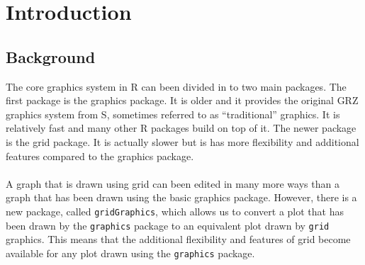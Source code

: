 \documentclass[a4paper,10pt]{article}
\begin{document}


\section{Introduction}
\subsection{Background}
The core graphics system in R can been divided in to two main packages. The first package is the graphics package. It is older and it provides the original GRZ graphics system from S, sometimes referred to as ``traditional'' graphics. It is relatively fast and many other R packages build on top of it. The newer package is the grid package. It is actually slower but is has more flexibility and additional features compared to the graphics package. \\\\
A graph that is drawn using grid can been edited in many more ways than a graph that has been drawn using the basic graphics package. However, there is a new package, called \texttt{gridGraphics}, which allows us to convert a plot that has been drawn by the \texttt{graphics} package to an equivalent plot drawn by \texttt{grid} graphics. This means that the additional flexibility and features of grid become available for any plot drawn using the \texttt{graphics} package. 
\end{document}
